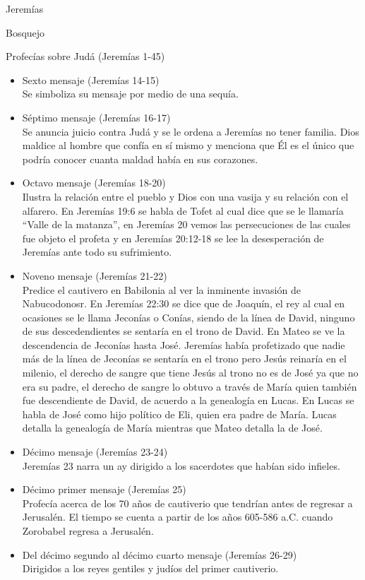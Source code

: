 \begin{section}{Jeremías}
\begin{subsection}{Bosquejo}
\begin{subsubsection}{Profecías sobre Judá (Jeremías 1-45)}
\begin{enumerate}
\begin{itemize}
							Jeremías usa símbolos y señales para comuncar su mensaje y su cautiverio.
						\item Sexto mensaje (Jeremías 14-15)\\
							Se simboliza su mensaje por medio de una sequía.
							\newpage
						\item Séptimo mensaje (Jeremías 16-17)\\
							Se anuncia juicio contra Judá y se le ordena a Jeremías no tener familia. Dios maldice al hombre que confía en sí mismo y menciona que Él es el único que podría conocer cuanta maldad había en sus corazones.
						\item Octavo mensaje (Jeremías 18-20)\\
							Ilustra la relación entre el pueblo y Dios con una vasija y su relación con el alfarero. En Jeremías 19:6 se habla de Tofet al cual dice que se le llamaría ``Valle de la matanza'', en Jeremías 20 vemos las persecuciones de las cuales fue objeto el profeta y en Jeremías 20:12-18 se lee la desesperación de Jeremías ante todo su sufrimiento. 
						\item Noveno mensaje (Jeremías 21-22)\\
							Predice el cautivero en Babilonia al ver la inminente invasión de Nabucodonosr. En Jeremías 22:30 se dice que de Joaquín, el rey al cual en ocasiones se le llama Jeconías o Conías, siendo de la línea de David, ninguno de sus descedendientes se sentaría en el trono de David. En Mateo se ve la descendencia de Jeconías hasta José. Jeremías había profetizado que nadie más de la línea de Jeconías se sentaría en el trono pero Jesús reinaría en el milenio, el derecho de sangre que tiene Jesús al trono no es de José ya que no era su padre, el derecho de sangre lo obtuvo a través de María quien también fue descendiente de David, de acuerdo a la genealogía en Lucas. En Lucas se habla de José como hijo político de Eli,  quien era padre de María. Lucas detalla la genealogía de María mientras que Mateo detalla la de José.\\
						\item Décimo mensaje (Jeremías 23-24)\\
							Jeremías 23 narra un ay dirigido a los sacerdotes que habían sido infieles.
						\item Décimo primer mensaje (Jeremías 25)\\
							Profecía acerca de los 70 años de cautiverio que tendrían antes de regresar a Jerusalén. El tiempo se cuenta a partir de los años 605-586 a.C. cuando Zorobabel regresa a Jerusalén.
						\item Del décimo segundo al décimo cuarto mensaje (Jeremías 26-29)\\
							Dirigidos a los reyes gentiles y judíos del primer cautiverio.


\end{itemize}
\end{enumerate}
\end{subsubsection}
\end{subsection}
\end{section}
